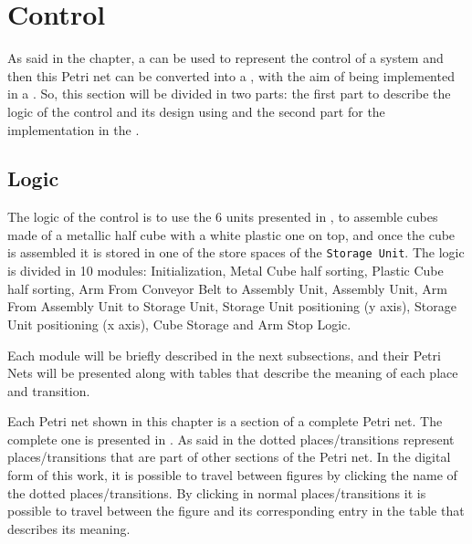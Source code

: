 
\chapter{Control}
\label{cha:control}

As said in the  chapter, a \CIPN{} can be used to
represent the control of a system and then this Petri net can be converted into
a \LD{}, with the aim of being implemented in a \PLC. So, this section will be divided in two
parts: the first part to describe the logic of the control and its design using \CIPN{} and
the second part for the implementation in the \PLC.

\section{Logic}
\label{sec:logic}
The logic of the control is to use the 6 units presented in
, to assemble cubes made of a metallic half cube with a
white plastic one on top, and once the cube is assembled it is stored in one of
the store spaces of the \verb|Storage Unit|. 
The logic is divided in 10 modules:
 Initialization, Metal Cube half sorting, Plastic Cube half sorting, Arm From
 Conveyor Belt to Assembly Unit, Assembly Unit, Arm From Assembly Unit to
 Storage Unit, Storage Unit positioning (y axis), Storage Unit positioning (x
 axis), Cube Storage and Arm Stop Logic.

Each module will be briefly described in the next subsections, and their Petri
Nets will be presented along with tables that describe the meaning of each place
and transition.

\begin{observation}
  Each Petri net shown in this chapter is a section of a complete Petri net.
  The complete one is presented in . As said
in  the dotted places\slash transitions represent places\slash transitions that are part of other sections of the Petri net. In the
digital form of this work, it is possible to travel between figures by clicking
the name of the dotted places\slash transitions. By clicking in normal
places\slash transitions it is possible to travel between the figure and its
corresponding entry in the table that describes its meaning.
  
\end{observation}
